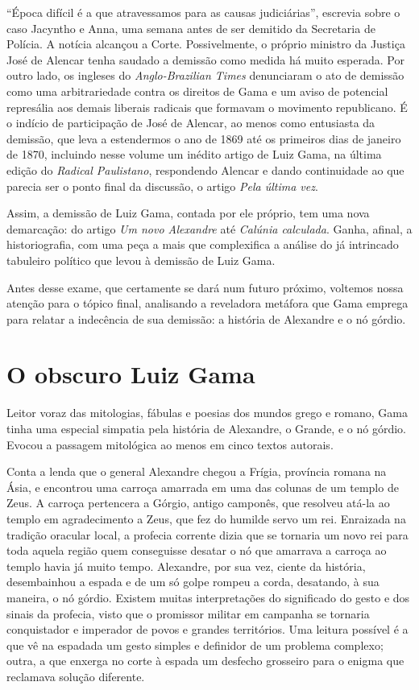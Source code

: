 ``Época difícil é a que atravessamos para as causas judiciárias'',
escrevia sobre o caso Jacyntho e Anna, uma semana antes de ser demitido
da Secretaria de Polícia. A notícia alcançou a Corte. Possivelmente, o
próprio ministro da Justiça José de Alencar tenha saudado a demissão
como medida há muito esperada. Por outro lado, os ingleses do
\emph{Anglo-Brazilian Times} denunciaram o ato de demissão como uma
arbitrariedade contra os direitos de Gama e um aviso de potencial
represália aos demais liberais radicais que formavam o movimento
republicano. É o indício de participação de José de Alencar, ao menos
como entusiasta da demissão, que leva a estendermos o ano de 1869 até os
primeiros dias de janeiro de 1870, incluindo nesse volume um inédito
artigo de Luiz Gama, na última edição do \emph{Radical Paulistano},
respondendo Alencar e dando continuidade ao que parecia ser o ponto
final da discussão, o artigo \emph{Pela última vez}.

Assim, a demissão de Luiz Gama, contada por ele próprio, tem uma nova
demarcação: do artigo \emph{Um novo Alexandre} até \emph{Calúnia
calculada}. Ganha, afinal, a historiografia, com uma peça a mais que
complexifica a análise do já intrincado tabuleiro político que levou à
demissão de Luiz Gama.

Antes desse exame, que certamente se dará num futuro próximo, voltemos
nossa atenção para o tópico final, analisando a reveladora metáfora que
Gama emprega para relatar a indecência de sua demissão: a história de
Alexandre e o nó górdio.

\section{O obscuro Luiz Gama}

Leitor voraz das mitologias, fábulas e poesias dos mundos grego e
romano, Gama tinha uma especial simpatia pela história de Alexandre, o
Grande, e o nó górdio. Evocou a passagem mitológica ao menos em cinco
textos autorais.

Conta a lenda que o general Alexandre chegou a Frígia, província romana
na Ásia, e encontrou uma carroça amarrada em uma das colunas de um
templo de Zeus. A carroça pertencera a Górgio, antigo camponês, que
resolveu atá-la ao templo em agradecimento a Zeus, que fez do humilde
servo um rei. Enraizada na tradição oracular local, a profecia corrente
dizia que se tornaria um novo rei para toda aquela região quem
conseguisse desatar o nó que amarrava a carroça ao templo havia já muito
tempo. Alexandre, por sua vez, ciente da história, desembainhou a espada
e de um só golpe rompeu a corda, desatando, à sua maneira, o nó górdio.
Existem muitas interpretações do significado do gesto e dos sinais da
profecia, visto que o promissor militar em campanha se tornaria
conquistador e imperador de povos e grandes territórios. Uma leitura
possível é a que vê na espadada um gesto simples e definidor de um
problema complexo; outra, a que enxerga no corte à espada um desfecho
grosseiro para o enigma que reclamava solução diferente.

